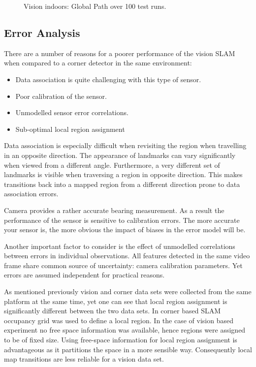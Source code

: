 \begin{figure}[htbp]
  \centering
  \caption{Vision indoors: Global Path over 100 test runs.}
  \label{fig:edge_odo_all}
\end{figure}



\subsection{Error Analysis}

There are a number of reasons for a poorer performance of the vision
SLAM when compared to a corner detector in the same environment:

\begin{itemize}
\item Data association is quite challenging with this type of
sensor. 
\item Poor calibration of the sensor.
\item Unmodelled sensor error correlations.
\item Sub-optimal local region assignment
\end{itemize}

Data association is especially difficult when revisiting the region
when travelling in an opposite direction. The appearance of landmarks
can vary significantly when viewed from a different
angle. Furthermore, a very different set of landmarks is visible when
traversing a region in opposite direction. This makes transitions back
into a mapped region from a different direction prone to data
association errors.

Camera provides a rather accurate bearing measurement. As a result the
performance of the sensor is sensitive to calibration errors. The more
accurate your sensor is, the more obvious the impact of biases in the
error model will be.

Another important factor to consider is the effect of unmodelled
correlations between errors in individual observations. All features
detected in the same video frame share common source of uncertainty:
camera calibration parameters. Yet errors are assumed independent for
practical reasons.

As mentioned previously vision and corner data sets were collected
from the same platform at the same time, yet one can see that local
region assignment is significantly different between the two data
sets. In corner based SLAM occupancy grid was used to define a local
region. In the case of vision based experiment no free space
information was available, hence regions were assigned to be of fixed
size. Using free-space information for local region assignment is
advantageous as it partitions the space in a more sensible
way. Consequently local map transitions are less reliable for a vision
data set.


